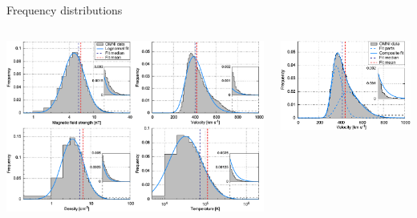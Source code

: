 \begin{frame}[plain,c]{Frequency distributions}{}
	\begin{columns}[c]	%
	
		\hspace*{-21pt}
		\includegraphics[width=1.1\textwidth]{../figures_paper/histogram_fits_4_a_zoom_paper_pdfplot.pdf}

	
		\hspace*{-10pt}
		\includegraphics[width=1.2\textwidth]{../figures_paper/histogram_fits_V_a_zoom_dbl_paper_pdfplot.pdf}

	\end{columns}
	\vspace*{\fill} \hfill \hyperlink{lognormal_distribution}{}
\end{frame}
